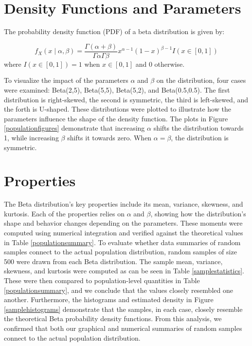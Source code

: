 \documentclass{article}\usepackage[]{graphicx}\usepackage[]{xcolor}
\begin{document}
\begin{multicols}{2}
\section{Density Functions and Parameters}
The probability density function (PDF) of a beta distribution is given by:

$$
f_X(x \mid \alpha, \beta) = \frac{\Gamma(\alpha + \beta)}{\Gamma \alpha \Gamma \beta} x^{\alpha-1} (1-x)^{\beta - 1} I(x \in [0,1])
$$
where $I(x \in [0,1]) = 1$ when $x \in [0, 1]$ and $0$ otherwise.

To visualize the impact of the parameters $\alpha$ and $\beta$ on the distribution, four cases were examined: Beta(2,5), Beta(5,5), Beta(5,2), and Beta(0.5,0.5). The first distribution is right-skewed, the second is symmetric, the third is left-skewed, and the forth is U-shaped. These distributions were plotted to illustrate how the parameters influence the shape of the density function. The plots in Figure \ref{populationfigures} demonstrate that increasing $\alpha$ shifts the distribution towards 1, while increasing $\beta$ shifts it towards zero. When $\alpha = \beta$, the distribution is symmetric. 


\section{Properties}
The Beta distribution's key properties include its mean, variance, skewness, and kurtosis. Each of the properties relies on $\alpha$ and $\beta$, showing how the distribution's shape and behavior changes depending on the parameters. These moments were computed using numerical integration and verified against the theoretical values in Table \ref{populationsummary}. 
To evaluate whether data summaries of random samples connect to the actual population distribution, random samples of size 500 were drawn from each Beta distribution. The sample mean, variance, skewness, and kurtosis were computed as can be seen in Table \ref{samplestatistics}. These were then compared to population-level quantities in Table \ref{populationsummary}, and we conclude that the values closely resembled one another. Furthermore, the histograms and estimated density in Figure \ref{samplehistograms} demonstrate that the samples, in each case, closely resemble the theoretical Beta probability density functions. From this analysis, we confirmed that both our graphical and numerical summaries of random samples connect to the actual population distribution.




\end{multicols}
\end{document}
